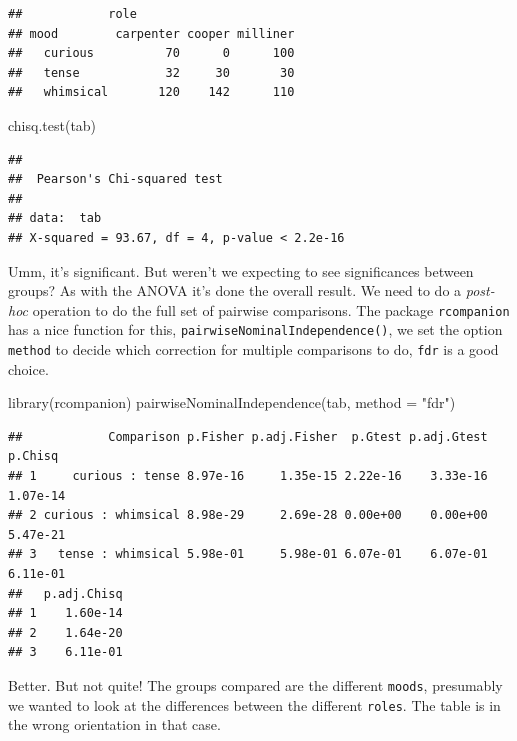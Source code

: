 \documentclass[
]{book}
\newenvironment{Shaded}{\begin{snugshade}}{\end{snugshade}}
\newcommand{\AttributeTok}[1]{\textcolor[rgb]{0.77,0.63,0.00}{#1}}
\newcommand{\FunctionTok}[1]{\textcolor[rgb]{0.00,0.00,0.00}{#1}}
\newcommand{\NormalTok}[1]{#1}
\newcommand{\StringTok}[1]{\textcolor[rgb]{0.31,0.60,0.02}{#1}}
\begin{document}
\begin{verbatim}
##            role
## mood        carpenter cooper milliner
##   curious          70      0      100
##   tense            32     30       30
##   whimsical       120    142      110
\end{verbatim}

\begin{Shaded}
\begin{Highlighting}[]
\FunctionTok{chisq.test}\NormalTok{(tab)}
\end{Highlighting}
\end{Shaded}

\begin{verbatim}
## 
## 	Pearson's Chi-squared test
## 
## data:  tab
## X-squared = 93.67, df = 4, p-value < 2.2e-16
\end{verbatim}

Umm, it's significant. But weren't we expecting to see significances between groups? As with the ANOVA it's done the overall result. We need to do a \emph{post-hoc} operation to do the full set of pairwise comparisons. The package \texttt{rcompanion} has a nice function for this, \texttt{pairwiseNominalIndependence()}, we set the option \texttt{method} to decide which correction for multiple comparisons to do, \texttt{fdr} is a good choice.

\begin{Shaded}
\begin{Highlighting}[]
\FunctionTok{library}\NormalTok{(rcompanion)}
\FunctionTok{pairwiseNominalIndependence}\NormalTok{(tab, }\AttributeTok{method =} \StringTok{"fdr"}\NormalTok{)}
\end{Highlighting}
\end{Shaded}

\begin{verbatim}
##            Comparison p.Fisher p.adj.Fisher  p.Gtest p.adj.Gtest  p.Chisq
## 1     curious : tense 8.97e-16     1.35e-15 2.22e-16    3.33e-16 1.07e-14
## 2 curious : whimsical 8.98e-29     2.69e-28 0.00e+00    0.00e+00 5.47e-21
## 3   tense : whimsical 5.98e-01     5.98e-01 6.07e-01    6.07e-01 6.11e-01
##   p.adj.Chisq
## 1    1.60e-14
## 2    1.64e-20
## 3    6.11e-01
\end{verbatim}

Better. But not quite! The groups compared are the different \texttt{moods}, presumably we wanted to look at the differences between the different \texttt{roles}. The table is in the wrong orientation in that case.
\end{document}
